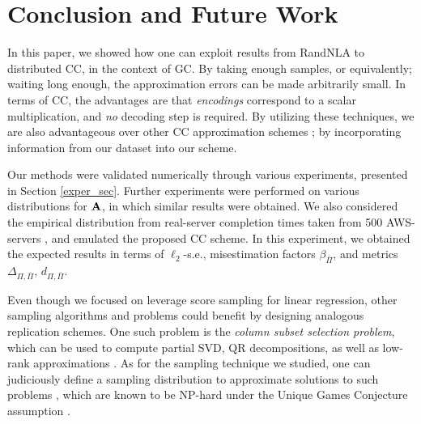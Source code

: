 \documentclass[journal,letterpaper,onecolumn,twoside,nofonttune]{IEEEtran}
\newcommand{\Ab}{\bold{A}}
\newcommand{\Pib}{\bar{\Pi}}
\newcommand{\SVD}{\mathrm{SVD}}
\newcommand{\QR}{\mathrm{QR}}
\begin{document}

\section{Conclusion and Future Work}
\label{concl_sec}

In this paper, we showed how one can exploit results from RandNLA to distributed CC, in the context of GC. By taking enough samples, or equivalently; waiting long enough, the approximation errors can be made arbitrarily small. In terms of CC, the advantages are that \textit{encodings} correspond to a scalar multiplication, and \textit{no} decoding step is required. By utilizing these techniques, we are also advantageous over other CC approximation schemes \cite{SH22,BWE19,CPH20a,CPH20c,CP18,CPE17,FD16,GW20,HYKM19,KKR19,RTTD17}; by incorporating information from our dataset into our scheme.

Our methods were validated numerically through various experiments, presented in Section \ref{exper_sec}. Further experiments were performed on various distributions for $\Ab$, in which similar results were obtained. We also considered the empirical distribution from real-server completion times taken from 500 AWS-servers \cite{BP19a}, and emulated the proposed CC scheme. In this experiment, we obtained the expected results in terms of $\ell_2$-s.e., misestimation factors $\beta_{\Pib}$, and metrics $\Delta_{\Pi,\Pib}$, $d_{\Pi,\Pib}$.

Even though we focused on leverage score sampling for linear regression, other sampling algorithms and problems could benefit by designing analogous replication schemes. One such problem is the \textit{column subset selection problem}, which can be used to compute partial $\SVD$, $\QR$ decompositions, as well as low-rank approximations \cite{Mah16}. As for the sampling technique we studied, one can judiciously define a sampling distribution to approximate solutions to such problems \cite{BMD09}, which are known to be \textsf{NP-hard} under the Unique Games Conjecture assumption \cite{Civ14}.
\end{document}
